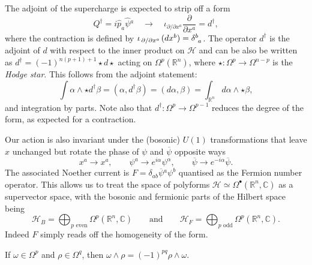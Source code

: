 
The adjoint of the supercharge is expected to strip off a form
\begin{equation}
  Q^{\dagger} = i \hat{p}_a \hat{\psi}{}^a
  \quad \longrightarrow \quad 
  \iota_{\partial / \partial x^a} \frac{\partial }{\partial x^{a}} = d^{\dagger},
\end{equation}
where the contraction is defined by $\iota_{\flatfrac{\partial }{\partial x^{a}}} (d x^{b}) = \delta\indices{^{b}_{a}}$.
The operator $d^{\dagger}$ is the adjoint of $d$ with respect to the inner product on $\mathscr{H}$ and can be also be written as $d^{\dagger} = (-1)^{n (p+1) + 1} \star d \star {}$ acting on $\Omega^p (\mathbb{R}^n)$, where $\star \colon \Omega^p \to \Omega^{n-p}$ is the \emph{Hodge star}.
This follows from the adjoint statement:
\begin{equation}
  \int \alpha \wedge \star d^{\dagger} \beta = (\alpha, d^{\dagger} \beta) = (d\alpha, \beta) = \int_{\mathbb{R}^n} d\alpha \wedge \star \beta,
\end{equation}
and integration by parts.
Note also that $d^{\dagger} \colon \Omega^p \to \Omega^{p-1}$ reduces the degree of the form, as expected for a contraction.

Our action is also invariant under the (bosonic) $U(1)$ transformations that leave $x$ unchanged but rotate the phase of $\psi$ and $\overline{\psi}{}$ opposite ways
\begin{equation}
  \label{eq:bosonic_u1}
  x^{a} \to x^{a} , \qquad \psi^{a} \to e^{i \alpha} \psi^{\alpha}, \qquad \overline{\psi}{} \to e^{-i \alpha} \overline{\psi}{}.
\end{equation}
The associated Noether current is $F = \delta_{ab} \overline{\psi}{}^{a} \psi^{b}$ quantised as the Fermion number operator.
This allows us to treat the space of polyforms $\mathscr{H} \simeq \Omega^\bullet(\mathbb{R}^n, \mathbb{C})$ as a supervector space, with the bosonic and fermionic parts of the Hilbert space being
\begin{equation}
  \mathscr{H}_{B} = \bigoplus_{p \text{ even}} \Omega^{p}(\mathbb{R}^n, \mathbb{C}) \qquad \text{and} \qquad \mathscr{H}_F = \bigoplus_{p \text{ odd}} \Omega^p (\mathbb{R}^n, \mathbb{C}).
\end{equation}
Indeed $F$  simply reads off the homogeneity of the form.
\begin{remark}
  If $\omega \in \Omega^p$ and $\rho \in \Omega^q$, then $\omega \wedge \rho = (-1)^{pq} \rho \wedge \omega$.
\end{remark}

